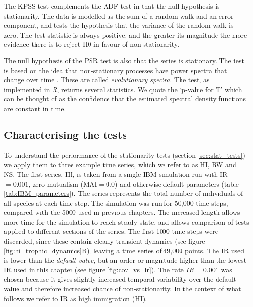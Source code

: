 The KPSS test complements the ADF test in that the null hypothesis is stationarity. The data is modelled as the sum of a random-walk and an error component, and tests the hypothesis that the variance of the random walk is zero. The test statistic is always positive, and the greater its magnitude the more evidence there is to reject H0 in favour of non-stationarity.

The null hypothesis of the PSR test is also that the series is stationary. The test is based on the idea that non-stationary processes have power spectra that change over time \cite{priestley1969test}. These are called \emph{evolutionary spectra}. The test, as implemented in \emph{R}, returns several statistics. We quote the `p-value for T' which can be thought of as the confidence that the estimated spectral density functions are constant in time.

\subsection{Characterising the tests}
\label{sec:characterising_stat_tests}


To understand the performance of the stationarity tests (section \ref{sec:stat_tests}) we apply them to three example time series, which we refer to as HI, RW and NS. The first series, HI, is taken from a single IBM simulation run with  IR$=0.001$, zero mutualism (MAI$=0.0$) and otherwise default parameters (table \ref{tab:IBM_parameters}).  The series represents the total number of individuals of all species at each time step. The simulation was run for 50,000 time steps, compared with the 5000 used in previous chapters. The increased length allows more time for the simulation to reach steady-state, and allows comparison of tests applied to different sections of the series. The first 1000 time steps were discarded, since these contain clearly transient dynamics (see figure \ref{fig:hi_trophic_dynamics}B), leaving a time series of 49,000 points. The IR used is lower than the \emph{default value}, but an order or magnitude higher than the lowest IR used in this chapter (see figure \ref{fig:cov_vs_ir}). The rate $IR=0.001$ was chosen because it gives slightly increased temporal variability over the default value and therefore increased chance of non-stationarity. In the context of what follows we refer to IR as high immigration (HI).


